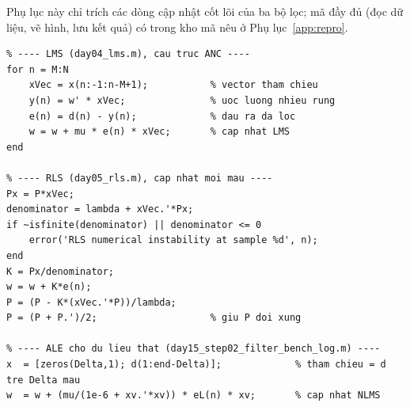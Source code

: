 \documentclass[../main.tex]{subfiles}
\begin{document}
Phụ lục này chỉ trích các dòng cập nhật cốt lõi của ba bộ lọc; mã đầy đủ (đọc dữ liệu, vẽ hình, lưu kết quả) có trong kho mã nêu ở Phụ lục~\ref{app:repro}.

\begin{lstlisting}
% ---- LMS (day04_lms.m), cau truc ANC ----
for n = M:N
    xVec = x(n:-1:n-M+1);           % vector tham chieu
    y(n) = w' * xVec;               % uoc luong nhieu rung
    e(n) = d(n) - y(n);             % dau ra da loc
    w = w + mu * e(n) * xVec;       % cap nhat LMS
end

% ---- RLS (day05_rls.m), cap nhat moi mau ----
Px = P*xVec;
denominator = lambda + xVec.'*Px;
if ~isfinite(denominator) || denominator <= 0
    error('RLS numerical instability at sample %d', n);
end
K = Px/denominator;
w = w + K*e(n);
P = (P - K*(xVec.'*P))/lambda;
P = (P + P.')/2;                    % giu P doi xung

% ---- ALE cho du lieu that (day15_step02_filter_bench_log.m) ----
x  = [zeros(Delta,1); d(1:end-Delta)];             % tham chieu = d tre Delta mau
w  = w + (mu/(1e-6 + xv.'*xv)) * eL(n) * xv;       % cap nhat NLMS
\end{lstlisting}
\end{document}

